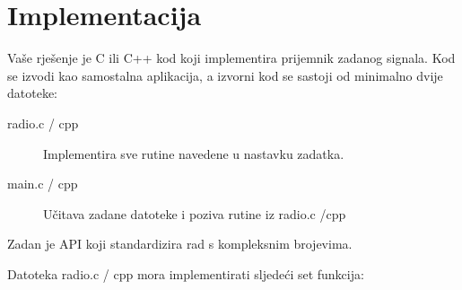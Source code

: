\documentclass[a4paper]{article}
\begin{document}
\section{Implementacija}

Vaše rješenje je C ili C++ kod koji implementira prijemnik zadanog signala. Kod se izvodi kao samostalna aplikacija, a izvorni kod se sastoji od minimalno dvije datoteke:
\begin{description}
	\item[radio.c / cpp] Implementira sve rutine navedene u nastavku zadatka.
	\item[main.c / cpp] Učitava zadane datoteke i poziva rutine iz radio.c /cpp
\end{description}
Zadan je API koji standardizira rad s kompleksnim brojevima.

Datoteka radio.c / cpp mora implementirati sljedeći set funkcija:
\end{document}
